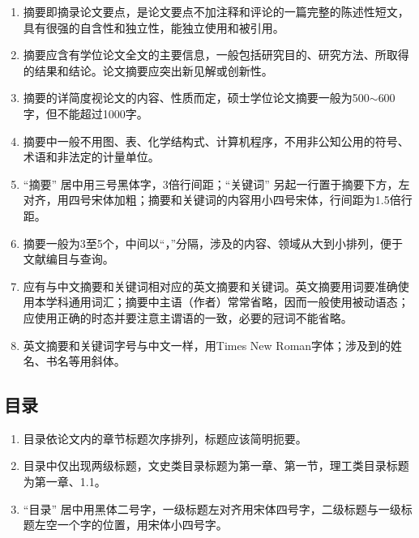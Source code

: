 \begin{enumerate}[label=\arabic*)]
	\item 摘要即摘录论文要点，是论文要点不加注释和评论的一篇完整的陈述性短文，具有很强的自含性和独立性，能独立使用和被引用。
	
	\item 摘要应含有学位论文全文的主要信息，一般包括研究目的、研究方法、所取得的结果和结论。论文摘要应突出新见解或创新性。
	
	\item 摘要的详简度视论文的内容、性质而定，硕士学位论文摘要一般为500$\sim$600字，但不能超过1000字。
	
	\item 摘要中一般不用图、表、化学结构式、计算机程序，不用非公知公用的符号、术语和非法定的计量单位。
	
	\item “摘要” 居中用三号黑体字，3倍行间距；“关键词” 另起一行置于摘要下方，左对齐，用四号宋体加粗；摘要和关键词的内容用小四号宋体，行间距为1.5倍行距。
	
	\item 摘要一般为3至5个，中间以“，”分隔，涉及的内容、领域从大到小排列，便于文献编目与查询。
	
	\item 应有与中文摘要和关键词相对应的英文摘要和关键词。英文摘要用词要准确使用本学科通用词汇；摘要中主语（作者）常常省略，因而一般使用被动语态；应使用正确的时态并要注意主谓语的一致，必要的冠词不能省略。
	
	\item 英文摘要和关键词字号与中文一样，用Times New Roman字体；涉及到的姓名、书名等用斜体。
\end{enumerate}

\subsection{目录}

\begin{enumerate}[label=\arabic*)]
	\item 目录依论文内的章节标题次序排列，标题应该简明扼要。
	
	\item 目录中仅出现两级标题，文史类目录标题为第一章、第一节，理工类目录标题为第一章、1.1。
	
	\item “目录” 居中用黑体二号字，一级标题左对齐用宋体四号字，二级标题与一级标题左空一个字的位置，用宋体小四号字。

\end{enumerate}

